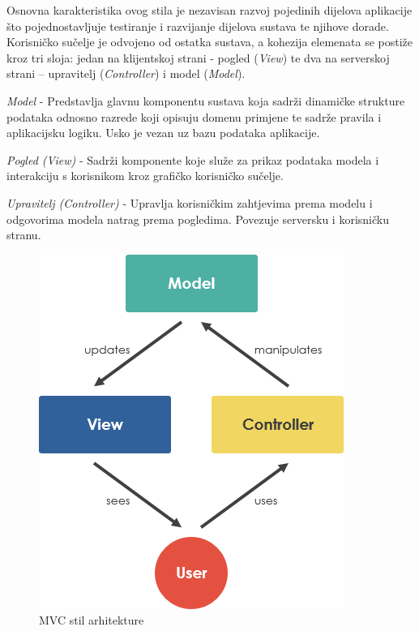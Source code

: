 		Osnovna	karakteristika ovog stila je	nezavisan razvoj pojedinih dijelova aplikacije što pojednostavljuje testiranje	i razvijanje dijelova sustava te	njihove	dorade. Korisničko sučelje je odvojeno od ostatka sustava, a kohezija elemenata se postiže kroz tri sloja: jedan na klijentskoj strani - pogled (\textit{View}) te dva na serverskoj strani – upravitelj (\textit{Controller}) i model (\textit{Model}).

		\begin{packed_enum}
			\item\textit{Model} - Predstavlja glavnu komponentu sustava koja sadrži dinamičke strukture podataka odnosno razrede koji opisuju domenu primjene te sadrže pravila i aplikacijsku logiku. Usko je vezan uz bazu podataka aplikacije.
			\item\textit{Pogled (View)} - Sadrži komponente koje služe za prikaz podataka modela i interakciju s korisnikom kroz grafičko korisničko sučelje.
			\item\textit{Upravitelj (Controller)} - Upravlja korisničkim zahtjevima prema modelu i odgovorima modela natrag prema pogledima. Povezuje serversku i korisničku stranu.
		\end{packed_enum}

		\begin{figure}[H]
			\includegraphics[scale=0.7]{slike/mvc-framework.PNG} 
			\centering
			\caption{MVC stil arhitekture}
			\label{mvc-framework}
		\end{figure}
	
